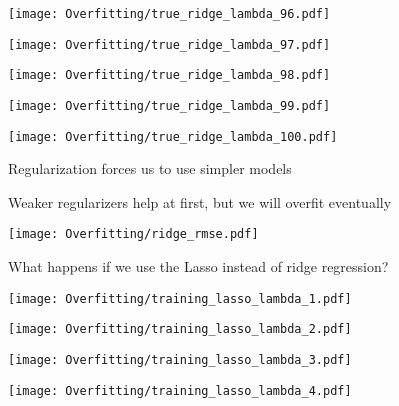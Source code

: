 \documentclass[xcolor=pdftex,dvipsnames,table]{beamer}
\begin{document}
\frame
{
	\begin{center}
		\texttt{[image: Overfitting/true\_ridge\_lambda\_96.pdf]}
	\end{center}
}

\frame
{
	\begin{center}
		\texttt{[image: Overfitting/true\_ridge\_lambda\_97.pdf]}
	\end{center}
}

\frame
{
	\begin{center}
		\texttt{[image: Overfitting/true\_ridge\_lambda\_98.pdf]}
	\end{center}
}

\frame
{
	\begin{center}
		\texttt{[image: Overfitting/true\_ridge\_lambda\_99.pdf]}
	\end{center}
}

\frame
{
	\begin{center}
		\texttt{[image: Overfitting/true\_ridge\_lambda\_100.pdf]}
	\end{center}
}

\frame
{
	Regularization forces us to use simpler models
}

\frame
{
	Weaker regularizers help at first, but we will overfit eventually
}

\frame
{
	\begin{center}
		\texttt{[image: Overfitting/ridge\_rmse.pdf]}
	\end{center}
}

\frame
{
	What happens if we use the Lasso instead of ridge regression?
}

\frame
{
	\begin{center}
		\texttt{[image: Overfitting/training\_lasso\_lambda\_1.pdf]}
	\end{center}
}

\frame
{
	\begin{center}
		\texttt{[image: Overfitting/training\_lasso\_lambda\_2.pdf]}
	\end{center}
}

\frame
{
	\begin{center}
		\texttt{[image: Overfitting/training\_lasso\_lambda\_3.pdf]}
	\end{center}
}

\frame
{
	\begin{center}
		\texttt{[image: Overfitting/training\_lasso\_lambda\_4.pdf]}
	\end{center}
}
\end{document}
